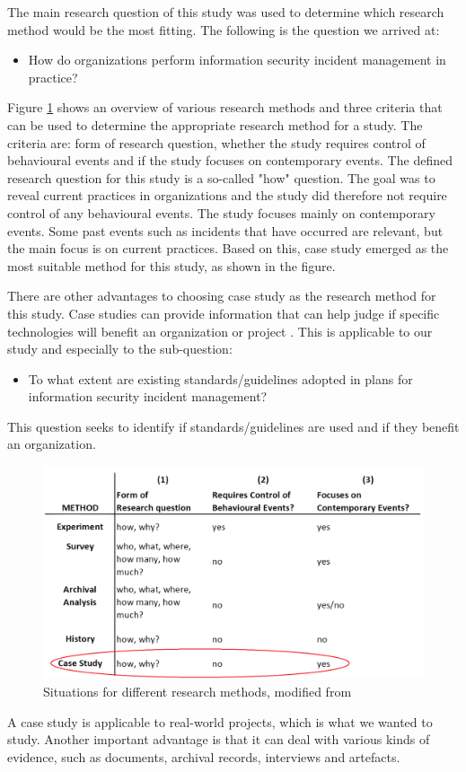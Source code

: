\label{sec:choiceOfMethod}
The main research question of this study was used to determine which research method would be the most fitting. The following is the question we arrived at:

\begin{itemize}
\item How do organizations perform information security incident management in practice?
\end{itemize}

Figure \ref{fig:methods} shows an overview of various research methods and three criteria that can be used to determine the appropriate research method for a study. The criteria are: form of research question, whether the study requires control of behavioural events and if the study focuses on contemporary events. The defined research question for this study is a so-called "how" question. The goal was to reveal current practices in organizations and the study did therefore not require control of any behavioural events. The study focuses mainly on contemporary events. Some past events such as incidents that have occurred are relevant, but the main focus is on current practices. Based on this, case study emerged as the most suitable method for this study, as shown in the figure.

There are other advantages to choosing case study as the research method for this study. Case studies can provide information that can help judge if specific technologies will benefit an organization or project \cite{kitchenham1995case}. This is applicable to our study and especially to the sub-question:

\begin{itemize}
\item To what extent are existing standards/guidelines adopted in plans for information security incident management?
\end{itemize}

This question seeks to identify if standards/guidelines are used and if they benefit an organization.

\begin{figure}[H]
\begin{center}
\includegraphics[scale=0.35]{methods.png}
\caption[Situations for different research methods]{Situations for different research methods, modified from \cite{CaseStudyResearch}}
\label{fig:methods}
\end{center}
\end{figure}

A case study is applicable to real-world projects, which is what we wanted to study. Another important advantage is that it can deal with various kinds of evidence, such as documents, archival records, interviews and artefacts.